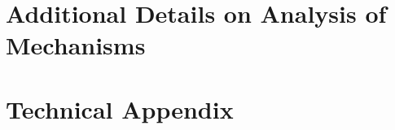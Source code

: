 \documentclass[english,letterpaper,12pt]{article}
\begin{document}
\begin{onehalfspacing}
\begin{appendix}
    \newpage
    \section{Additional Details on Analysis of Mechanisms}\label{sec:additionalmec}
    	\setcounter{table}{0}
	\renewcommand{\thetable}{E\arabic{table}}
	
	\setcounter{figure}{0}
	\renewcommand{\thefigure}{E\arabic{figure}}
    


       

		\newpage
  


 


 
 
		\section{Technical Appendix}
        	\setcounter{table}{0}
	\renewcommand{\thetable}{G\arabic{table}}
	
	\setcounter{figure}{0}
	\renewcommand{\thefigure}{G\arabic{figure}}

        


        
     
        
     
        

     

		

        
      
		
		
	\end{appendix}

\end{onehalfspacing}
	
\end{document}
